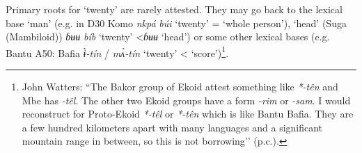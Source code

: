 Primary roots for `twenty' are rarely attested. They may go back to the lexical base `man' (e.g. in D30 Komo \textit{nkpá} \textit{b{\'{u}}i} ‘twenty’ = ‘whole person’), `head' (Suga (Mambiloid)) \textit{ɓʉʉ} \textit{bíb} ‘twenty’ <\textit{ɓʉʉ} ‘head’) or some other lexical bases (e.g. Bantu A50: Bafia \textit{{\`{ɨ}}-tín} / \textit{m{\`{ʌ}}-tín} ‘twenty’ < `score')\footnote{John Watters: “The Bakor group of Ekoid attest something like \textit{*-t{\^{e}}n} and Mbe has \textit{-t{\^{e}}l}. The other two Ekoid groups have a form \textit{-rim} or \textit{-sam}. I would reconstruct for Proto-Ekoid \textit{*-t{\^{e}}l} or \textit{*-t{\^{e}}n} which is like Bantu Bafia. They are a few hundred kilometers apart with many languages and a significant mountain range in between, so this is not borrowing’’ (p.c.).}. 

\clearpage
